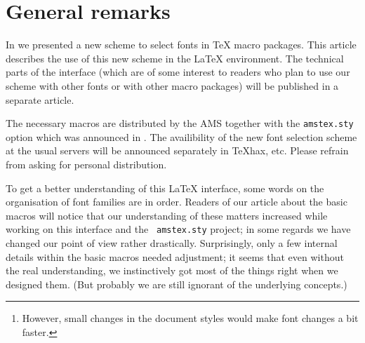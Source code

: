  \maketitle


 \tableofcontents

 \begin{abstract}
   In this article we describe the use of the new font selection scheme
   in the standard \LaTeX{} environment.
   The main characteristics are:
   \begin{itemize}
      \item
        The possibility to change family, series, shape and sizes
        independently of one another.
      \item
        The existence of a style file to process older documents
        without any changes to their layout and their input files.
      \item
	A macro setup which is consistent with existing standard
        document styles.\footnote{However, small changes in the document
                                  styles would make font changes a bit
                                  faster.}
   \end{itemize}
   It is planned to incorporate this font selection scheme into
   \LaTeX{} version 2.10.
 \end{abstract}

 \section{General remarks}

 In  we presented a new scheme to select fonts in \TeX{}
 macro packages.  This article describes the use of this new scheme in
 the \LaTeX{} environment.  The technical parts of the interface (which
 are of some interest to readers who plan to use our scheme with
 other fonts or with other macro packages) will be published in a
 separate article.

 The necessary macros are distributed by the AMS together with the
 {\tt amstex.sty} option which was announced in .
 The availibility of the new font selection scheme at the usual
 servers will be announced separately in \TeX{}hax, etc. Please
 refrain from asking for personal distribution.

 To get a better understanding of this \LaTeX{} interface, some words on
 the organisation of font families are in order.  Readers of our
 article about the basic macros will notice that our understanding of
 these matters increased while working on this interface and the {\tt
 amstex.sty} project; in some regards we have changed our point of view
 rather drastically.
 Surprisingly, only a few internal details within the basic
 macros needed adjustment; it seems that even without the real
 understanding, we
 instinctively got most of the things right when we designed them.  (But
 probably we  are still ignorant of the underlying concepts.)

